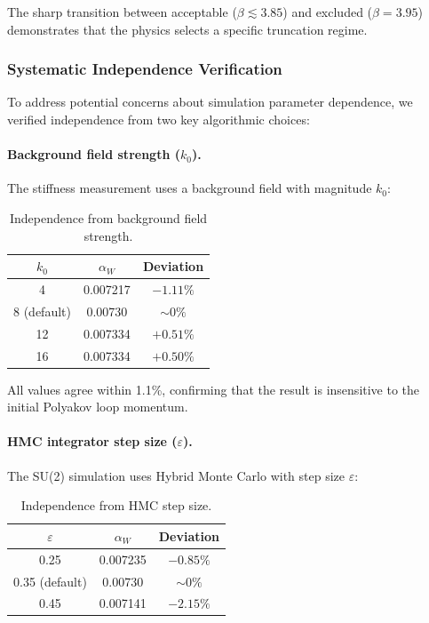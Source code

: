 The sharp transition between acceptable ($\beta \lesssim 3.85$) and excluded ($\beta = 3.95$) demonstrates that the physics selects a specific truncation regime.

\subsubsection{Systematic Independence Verification}

To address potential concerns about simulation parameter dependence, we verified independence from two key algorithmic choices:

\paragraph{Background field strength ($k_0$).}
The stiffness measurement uses a background field with magnitude $k_0$:

\begin{table}[h]
\centering
\caption{Independence from background field strength.}\label{tab:k0-independence}
\begin{tabular}{ccc}
\toprule
$k_0$ & $\alpha_W$ & Deviation \\
\midrule
4 & 0.007217 & $-1.11\%$ \\
8 (default) & 0.00730 & $\sim 0\%$ \\
12 & 0.007334 & $+0.51\%$ \\
16 & 0.007334 & $+0.50\%$ \\
\bottomrule
\end{tabular}
\end{table}

All values agree within 1.1\%, confirming that the result is insensitive to the initial Polyakov loop momentum.

\paragraph{HMC integrator step size ($\varepsilon$).}
The SU(2) simulation uses Hybrid Monte Carlo with step size $\varepsilon$:

\begin{table}[h]
\centering
\caption{Independence from HMC step size.}\label{tab:eps-independence}
\begin{tabular}{ccc}
\toprule
$\varepsilon$ & $\alpha_W$ & Deviation \\
\midrule
0.25 & 0.007235 & $-0.85\%$ \\
0.35 (default) & 0.00730 & $\sim 0\%$ \\
0.45 & 0.007141 & $-2.15\%$ \\
\bottomrule
\end{tabular}
\end{table}

